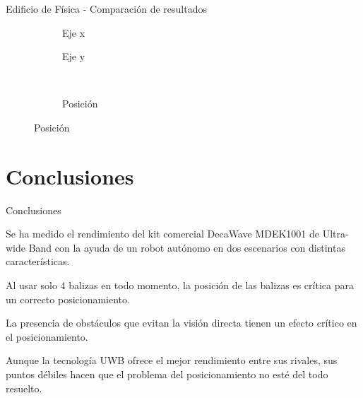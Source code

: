 \documentclass[xcolor=table]{beamer}
\begin{document}
  \begin{frame}{Edificio de Física - Comparación de resultados}
    \vspace*{-0.2cm}
    \begin{figure}[H]
      \centering
        \begin{subfigure}[b]{.3\textwidth}
          \centering
          \hspace*{-0.8cm}
           
          \vspace*{-0.5cm}
          \caption{Eje x}
          \label{fig:boxplot_fisica_x}
        \end{subfigure}
        \hspace*{0.1cm}
        \begin{subfigure}[b]{.3\textwidth}
          \centering
            
          \vspace*{-0.5cm}
          \caption{Eje y}
          \label{fig:boxplot_fisica_y}
        \end{subfigure}
        ~~~~
        \begin{subfigure}[b]{.3\textwidth}
            \centering
              
            \vspace*{-0.5cm}
            \caption{Posición}
            \label{fig:boxplot_fisica_pos}
          \end{subfigure}
        \label{fig:boxplot_fisica}
    \end{figure}
  \end{frame}

\section{Conclusiones}
\begin{frame}{Conclusiones}

  Se ha medido el rendimiento del kit comercial DecaWave MDEK1001 de Ultra-wide Band con la ayuda de un robot autónomo en dos escenarios con distintas características.
  

  Al usar solo 4 balizas en todo momento, la posición de las balizas es crítica para un correcto posicionamiento.

  La presencia de obstáculos que evitan la visión directa tienen un efecto crítico en el posicionamiento.

 Aunque la tecnología UWB ofrece el mejor rendimiento entre sus rivales, sus puntos débiles hacen que el problema del posicionamiento no esté del todo resuelto. 
\end{frame}

\maketitle
\end{document}

